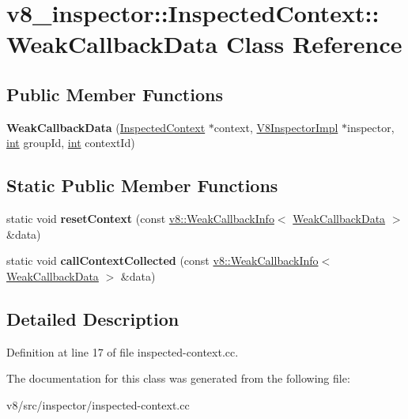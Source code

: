 \hypertarget{classv8__inspector_1_1InspectedContext_1_1WeakCallbackData}{}\section{v8\+\_\+inspector\+:\+:Inspected\+Context\+:\+:Weak\+Callback\+Data Class Reference}
\label{classv8__inspector_1_1InspectedContext_1_1WeakCallbackData}
\subsection*{Public Member Functions}
\begin{DoxyCompactItemize}
\item 
\mbox{\label{classv8__inspector_1_1InspectedContext_1_1WeakCallbackData_a021aa592a1885d63e152954c38079192}} 
{\bfseries Weak\+Callback\+Data} (\mbox{\hyperlink{classv8__inspector_1_1InspectedContext}{Inspected\+Context}} $\ast$context, \mbox{\hyperlink{classv8__inspector_1_1V8InspectorImpl}{V8\+Inspector\+Impl}} $\ast$inspector, \mbox{\hyperlink{classint}{int}} group\+Id, \mbox{\hyperlink{classint}{int}} context\+Id)
\end{DoxyCompactItemize}
\subsection*{Static Public Member Functions}
\begin{DoxyCompactItemize}
\item 
\mbox{\label{classv8__inspector_1_1InspectedContext_1_1WeakCallbackData_af65c62d4904b6a37a3c2faa574b05a2b}} 
static void {\bfseries reset\+Context} (const \mbox{\hyperlink{classv8_1_1WeakCallbackInfo}{v8\+::\+Weak\+Callback\+Info}}$<$ \mbox{\hyperlink{classv8__inspector_1_1InspectedContext_1_1WeakCallbackData}{Weak\+Callback\+Data}} $>$ \&data)
\item 
\mbox{\label{classv8__inspector_1_1InspectedContext_1_1WeakCallbackData_ac329f0d79a9d38081a0a6f62505869d8}} 
static void {\bfseries call\+Context\+Collected} (const \mbox{\hyperlink{classv8_1_1WeakCallbackInfo}{v8\+::\+Weak\+Callback\+Info}}$<$ \mbox{\hyperlink{classv8__inspector_1_1InspectedContext_1_1WeakCallbackData}{Weak\+Callback\+Data}} $>$ \&data)
\end{DoxyCompactItemize}


\subsection{Detailed Description}


Definition at line 17 of file inspected-\/context.\+cc.



The documentation for this class was generated from the following file\+:\begin{DoxyCompactItemize}
\item 
v8/src/inspector/inspected-\/context.\+cc\end{DoxyCompactItemize}
